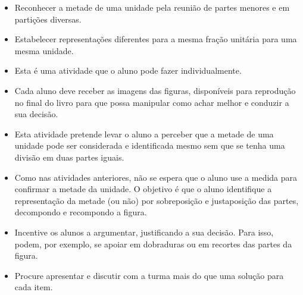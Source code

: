 \begin{multicols}{2}
\begin{solucao}{}{}
\begin{center}
\hspace{.2cm}
\end{center}
\end{solucao}
\pagebreak

\begin{objetivos}{}{}
\begin{itemize} %
    \item       Reconhecer a metade de uma unidade pela reunião de partes menores e em partições diversas.
    \item       Estabelecer representações diferentes para a mesma fração unitária para uma mesma unidade.
\end{itemize} %
\end{objetivos}

\begin{orientacoes}
  \begin{itemize} %
  \item       Esta é uma atividade que o aluno pode fazer individualmente.
  \item       Cada aluno deve receber as imagens das figuras, disponíveis para reprodução no final do livro para que possa manipular como achar melhor e conduzir a sua decisão.
  \item       Esta atividade pretende levar o aluno a perceber que a metade de uma unidade pode ser considerada e identificada mesmo sem que se tenha uma divisão em duas partes iguais.
  \item       Como nas atividades anteriores, não se espera que o aluno use a medida para confirmar a metade da unidade. O objetivo é que o aluno identifique a representação da metade (ou não) por sobreposição e justaposição das partes, decompondo e recompondo a figura.
  \item       Incentive os alunos a argumentar, justificando a sua decisão. Para isso, podem, por exemplo, se apoiar em dobraduras ou em recortes das partes da figura.
  \item       Procure apresentar e discutir com a turma mais do que uma solução para cada item.
\end{itemize} %
\end{orientacoes}


\end{multicols}
